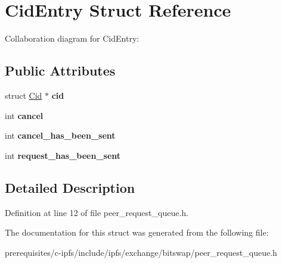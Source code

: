 \hypertarget{struct_cid_entry}{}\section{Cid\+Entry Struct Reference}
\label{struct_cid_entry}


Collaboration diagram for Cid\+Entry\+:
\subsection*{Public Attributes}
\begin{DoxyCompactItemize}
\item 
\mbox{\label{struct_cid_entry_ae654e5326e2c081c3933d18bf2bb81fb}} 
struct \mbox{\hyperlink{struct_cid}{Cid}} $\ast$ {\bfseries cid}
\item 
\mbox{\label{struct_cid_entry_a4ed4010c0e35466f15ca78046813b151}} 
int {\bfseries cancel}
\item 
\mbox{\label{struct_cid_entry_ace6e8de861039210651cbf82ec0d5528}} 
int {\bfseries cancel\+\_\+has\+\_\+been\+\_\+sent}
\item 
\mbox{\label{struct_cid_entry_afb9a611ca0dcb844514a772ff0080bce}} 
int {\bfseries request\+\_\+has\+\_\+been\+\_\+sent}
\end{DoxyCompactItemize}


\subsection{Detailed Description}


Definition at line 12 of file peer\+\_\+request\+\_\+queue.\+h.



The documentation for this struct was generated from the following file\+:\begin{DoxyCompactItemize}
\item 
prerequisites/c-\/ipfs/include/ipfs/exchange/bitswap/peer\+\_\+request\+\_\+queue.\+h\end{DoxyCompactItemize}
